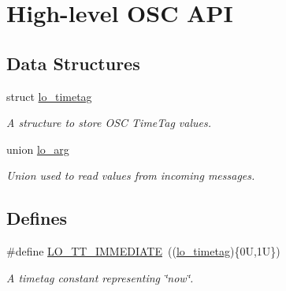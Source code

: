 \hypertarget{group__liblo}{\section{\-High-\/level \-O\-S\-C \-A\-P\-I}
\label{group__liblo}
}
\subsection*{\-Data \-Structures}
\begin{DoxyCompactItemize}
\item 
struct \hyperlink{structlo__timetag}{lo\-\_\-timetag}
\begin{DoxyCompactList}\small\item\em \-A structure to store \-O\-S\-C \-Time\-Tag values. \end{DoxyCompactList}\item 
union \hyperlink{unionlo__arg}{lo\-\_\-arg}
\begin{DoxyCompactList}\small\item\em \-Union used to read values from incoming messages. \end{DoxyCompactList}\end{DoxyCompactItemize}
\subsection*{\-Defines}
\begin{DoxyCompactItemize}
\item 
\#define \hyperlink{group__liblo_gafa8cfc08b763b0c039fb64a73c4c77da}{\-L\-O\-\_\-\-T\-T\-\_\-\-I\-M\-M\-E\-D\-I\-A\-T\-E}~((\hyperlink{structlo__timetag}{lo\-\_\-timetag})\{0\-U,1\-U\})
\begin{DoxyCompactList}\small\item\em \-A timetag constant representing \char`\"{}now\char`\"{}. \end{DoxyCompactList}\end{DoxyCompactItemize}
